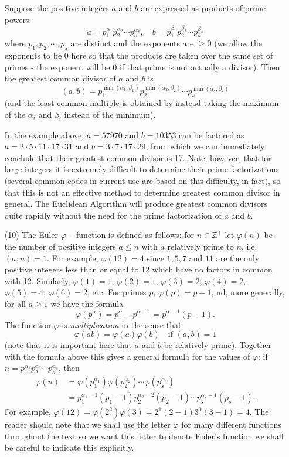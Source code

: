 \documentclass[cn,11pt,chinese]{elegantbook}
\numberwithin{equation}{section}
\begin{document}
\begin{enumerate}
Suppose the positive integers $a$ and $b$ are expressed as products of prime powers:
\[
a = p_1^{\alpha_1}p_2^{\alpha_2} \cdots p_s^{\alpha_s}, \quad b = p_1^{\beta_1}p_2^{\beta_2}\cdots p_s^{\beta_s}
\]
where $p_1,p_2,\cdots,p_s$ are distinct and the exponents are $\ge 0$ (we allow the exponents to be 0 here so that the products are taken over the same set of primes - the exponent will be 0 if that prime is not actually a divisor). Then the greatest common divisor of $a$ and $b$ is
\[
(a, b) = p_1^{\min(\alpha_1, \beta_1)}p_2^{\min(\alpha_2, \beta_2)}\cdots{}p_s^{\min(\alpha_s, \beta_s)}
\]
(and the least common multiple is obtained by instead taking the maximum of the $\alpha_i$ and $\beta_i$ instead of the minimum).

\begin{example}
In the example above, $a = 57970$ and $b = 10353$ can be factored as $a = 2 \cdot 5 \cdot 11 \cdot 17 \cdot 31$ and $b = 3 \cdot 7 \cdot 17 \cdot 29$, from which we can immediately conclude that their greatest common divisor is 17. Note, however, that for large integers it is extremely difficult to determine their prime factorizations (several common codes in current use are based on this difficulty, in fact), so that this is not an effective method to determine greatest common divisor in general. The Euclidean Algorithm will produce greatest common divisors quite rapidly without the need for the prime factorization of $a$ and $b$.
\end{example}

\item[(10)] The Euler $\varphi-$function is defined as follows: for $n \in \mathbb{Z}^+$ let $\varphi(n)$ be the number of positive integers $a \le n$ with $a$ relatively prime to $n$, i.e. $(a, n) = 1$. For example, $\varphi(12) = 4$ since $1,5,7$ and $11$ are the only positive integers less than or equal to 12 which have no factors in common with 12. Similarly, $\varphi(1)=1$, $\varphi(2)=1$, $\varphi(3)=2$, $\varphi(4)=2$, $\varphi(5)=4$, $\varphi(6)=2$, etc. For primes $p$, $\varphi(p) = p - 1$, nd, more generally, for all $a \ge 1$ we have the formula
\[
\varphi(p^{\alpha}) = p^{\alpha} - p^{\alpha-1} = p^{\alpha-1}(p-1).
\]
The function $\varphi$ is \emph{multiplication} in the sense that 
\[
\varphi(ab) = \varphi(a)\varphi(b)\quad \text{if }(a, b) = 1
\]
(note that it is important here that $a$ and $b$ be relatively prime). Together with the formula above this gives a general formula for the values of $\varphi$: if $n = p_1^{\alpha_1}p_2^{\alpha_2}\cdots{}p_s^{\alpha_s}$, then
\[
\begin{aligned}
\varphi(n) &= \varphi(p_1^{\alpha_1})\varphi(p_2^{\alpha_2})\cdots\varphi(p_s^{\alpha_s})\\
&=p_1^{\alpha_1-1}(p_1-1)p_2^{\alpha_2-2}(p_2-1)\cdots{}p_s^{\alpha_s-1}(p_s-1).
\end{aligned}
\]
For example, $\varphi(12) = \varphi(2^2)\varphi(3)=2^1(2-1)3^0(3-1)=4$. The reader should note that we shall use the letter $\varphi$ for many different functions throughout the text so we want this letter to denote Euler's function we shall be careful to indicate this explicitly.


\end{enumerate}
\end{document}
